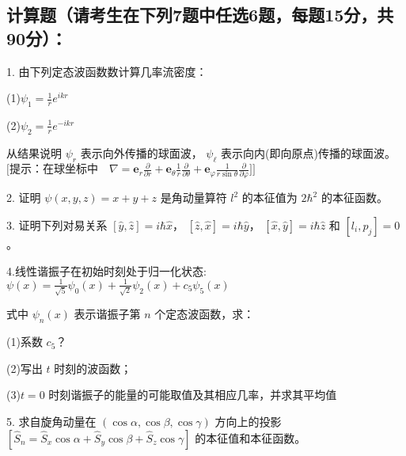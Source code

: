 \subsection{计算题（请考生在下列7题中任选6题，每题15分，共90分）：}

1. 由下列定态波函数数计算几率流密度：

(1)$\psi_1 = \frac{1}{r} e^{ikr}$ 


(2)$\psi_2 = \frac{1}{r} e^{-ikr}$

从结果说明 $\psi_r$ 表示向外传播的球面波， $\psi_\ell$ 表示向内(即向原点)传播的球面波。
$\text{[提示：在球坐标中}\quad \nabla = \mathbf{e}_r \frac{\partial}{\partial r} + \mathbf{e}_\theta \frac{1}{r} \frac{\partial}{\partial \theta} + \mathbf{e}_\varphi \frac{1}{r \sin \theta} \frac{\partial}{\partial \varphi}\text{]}]$

2. 证明 $\psi (x,y,z) = x + y + z$ 是角动量算符 $l^2$ 的本征值为 $2\hbar^2$ 的本征函数。

3. 证明下列对易关系 $[ \hat{y}, \hat{z} ] = i\hbar \hat{x}$， $[\hat{z}, \hat{x}] = i\hbar \hat{y}$， $[\hat{x}, \hat{y}] = i\hbar \hat{z}$ 和 $[l_i, p_j] = 0$。

4.线性谐振子在初始时刻处于归一化状态:
$\psi(x) = \frac{1}{\sqrt{5}} \psi_0(x) + \frac{1}{\sqrt{2}} \psi_2(x) + c_5 \psi_5(x)$

式中 $\psi_n(x)$ 表示谐振子第 $n$ 个定态波函数，求：

(1)系数 $c_5$？

(2)写出 $t$ 时刻的波函数；

(3)$t=0$ 时刻谐振子的能量的可能取值及其相应几率，并求其平均值

5. 求自旋角动量在 $(\cos \alpha, \cos \beta, \cos \gamma)$ 方向上的投影
$[\hat{S}_n = \hat{S}_x \cos \alpha + \hat{S}_y \cos \beta + \hat{S}_z \cos \gamma]$
的本征值和本征函数。

